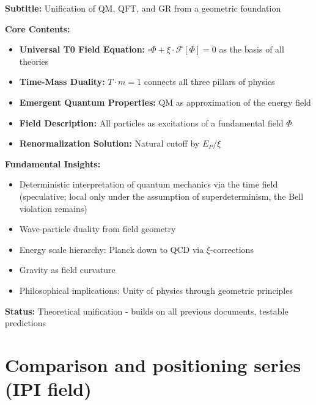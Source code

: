 	\begin{documentbox}
		\textbf{Subtitle:} Unification of QM, QFT, and GR from a geometric foundation
		
		\textbf{Core Contents:}
		\begin{itemize}
			\item \textbf{Universal T0 Field Equation:} $\square \Phi + \xi \cdot \mathcal{F}[\Phi] = 0$ as the basis of all theories
			\item \textbf{Time-Mass Duality:} $T \cdot m = 1$ connects all three pillars of physics
			\item \textbf{Emergent Quantum Properties:} QM as approximation of the energy field
			\item \textbf{Field Description:} All particles as excitations of a fundamental field $\Phi$
			\item \textbf{Renormalization Solution:} Natural cutoff by $E_P/\xi$
					\end{itemize}
		
		\textbf{Fundamental Insights:}
		\begin{itemize}
			\item Deterministic interpretation of quantum mechanics via the time field (speculative; local only under the assumption of superdeterminism, the Bell violation remains)
			\item Wave-particle duality from field geometry
			\item Energy scale hierarchy: Planck down to QCD via $\xi$-corrections
			\item Gravity as field curvature
			\item Philosophical implications: Unity of physics through geometric principles
		\end{itemize}
		
		\textbf{Status:} Theoretical unification - builds on all previous documents, testable predictions
	\end{documentbox}

	\section{Comparison and positioning series (IPI field)}

